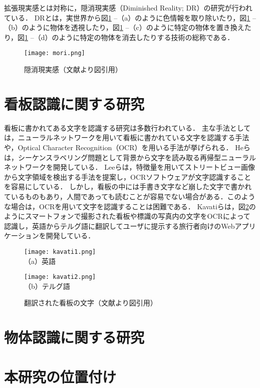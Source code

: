   拡張現実感とは対称に，隠消現実感（Diminished Reality; DR）の研究が行われている\cite{Mori:2017}．
  DRとは，実世界から図\ref{figure:mori} --（a）のように色情報を取り除いたり，図\ref{figure:mori} --（b）のように物体を透視したり，図\ref{figure:mori} --（c）のように特定の物体を置き換えたり，図\ref{figure:mori} --（d）のように特定の物体を消去したりする技術の総称である．
  \begin{figure}[tb]
    \centerline{\texttt{[image: mori.png]}}
    \caption{隠消現実感（文献\cite{Mori:2017}より図引用）}
    \label{figure:mori}
  \end{figure}

\section{看板認識に関する研究}
  看板に書かれてある文字を認識する研究は多数行われている．
  主な手法としては，ニューラルネットワークを用いて看板に書かれている文字を認識する手法や，Optical Character Recognition（OCR）を用いる手法が挙げられる．
  Heらは，シーケンスラベリング問題として背景から文字を読み取る再帰型ニューラルネットワークを開発している\cite{He:2016}．
  Leeらは，特徴量を用いてストリートビュー画像から文字領域を検出する手法を提案し，OCRソフトウェアが文字認識することを容易にしている\cite{Lee:2016}．
  しかし，看板の中には手書き文字など崩した文字で書かれているものもあり，人間であっても読むことが容易でない場合がある．このような場合は，OCRを用いて文字を認識することは困難である．
  Kavatiらは，図\ref{figure:kavati}のようにスマートフォンで撮影された看板や標識の写真内の文字をOCRによって認識し，英語からテルグ語に翻訳してユーザに提示する旅行者向けのWebアプリケーションを開発している\cite{Kavati:2017}．
  \begin{figure}[tb]
    \begin{minipage}{0.49\hsize}
      \begin{center}
        \texttt{[image: kavati1.png]}\\
        \small{（a）英語}
      \end{center}
    \end{minipage}
    \begin{minipage}{0.49\hsize}
      \begin{center}
        \texttt{[image: kavati2.png]}\\
        \small{（b）テルグ語}
      \end{center}
    \end{minipage}
    \vspace{2pt}
    \caption{翻訳された看板の文字（文献\cite{Kavati:2017}より図引用）}
    \label{figure:kavati}
  \end{figure}
  
\section{物体認識に関する研究}

\section{本研究の位置付け}

